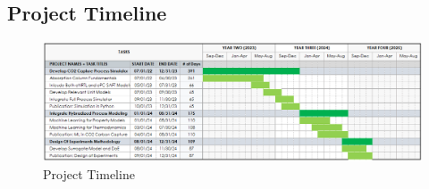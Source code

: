 \documentclass[12pt, letterpaper]{article}
\begin{document}
\newpage

\begin{landscape}
\subsection{Project Timeline}

\begin{figure}[ht]
    \begin{center}
        \includegraphics[width=22cm]{Project Timeline.png}
    \end{center}
    \caption{Project Timeline}
\end{figure}

\end{landscape}


\newpage

\printbibliography
\end{document}

